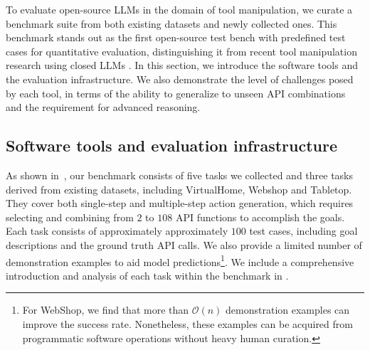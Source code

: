 % 
To evaluate open-source LLMs in the domain of tool manipulation, we curate a benchmark suite from both existing datasets and newly collected ones. This benchmark stands out as the first open-source test bench with predefined test cases for quantitative evaluation, distinguishing it from recent tool manipulation research using closed LLMs \cite{li2023api, qin2023tool}. In this section, we introduce the software tools and the evaluation infrastructure. We also demonstrate the level of challenges posed by each tool, in terms of the ability to generalize to unseen API combinations and the requirement for advanced reasoning.

\subsection{Software tools and evaluation infrastructure} 
As shown in~, our benchmark consists of five tasks we collected and three tasks derived from existing datasets, including VirtualHome\cite{puig2018virtualhome, huang2022language}, Webshop\cite{yao2023webshop} and Tabletop\cite{liang2022code}.
They cover both single-step and multiple-step action generation, which requires selecting and combining from $2$ to $108$ API functions to accomplish the goals. 
Each task consists of approximately approximately $100$ test cases, including goal descriptions and the ground truth API calls. We also provide a limited number of demonstration examples to aid model predictions\footnote{For WebShop, we find that more than $\mathcal{O}(n)$ demonstration examples can improve the success rate. Nonetheless, these examples can be acquired from programmatic software operations without heavy human curation.}. We include a comprehensive introduction and analysis of each task within the benchmark in . 


